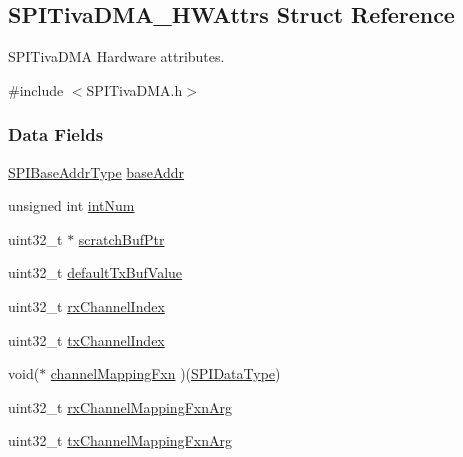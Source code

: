 \subsection{S\-P\-I\-Tiva\-D\-M\-A\-\_\-\-H\-W\-Attrs Struct Reference}
\label{struct_s_p_i_tiva_d_m_a___h_w_attrs}


S\-P\-I\-Tiva\-D\-M\-A Hardware attributes.  




{\ttfamily \#include $<$S\-P\-I\-Tiva\-D\-M\-A.\-h$>$}

\subsubsection*{Data Fields}
\begin{DoxyCompactItemize}
\item 
\hyperlink{_s_p_i_c_c3200_d_m_a_8h_a4b7e9f3739f6196bed13f9c3c549c96d}{S\-P\-I\-Base\-Addr\-Type} \hyperlink{struct_s_p_i_tiva_d_m_a___h_w_attrs_a3264130b8293c92d7556f4288da9e6c3}{base\-Addr}
\item 
unsigned int \hyperlink{struct_s_p_i_tiva_d_m_a___h_w_attrs_aa3c30677a08faf98b923022684288727}{int\-Num}
\item 
uint32\-\_\-t $\ast$ \hyperlink{struct_s_p_i_tiva_d_m_a___h_w_attrs_a91c1a3a97cc28823bdfebd0fdc659a26}{scratch\-Buf\-Ptr}
\item 
uint32\-\_\-t \hyperlink{struct_s_p_i_tiva_d_m_a___h_w_attrs_a9b0752c53408495fb1dfe9358668e023}{default\-Tx\-Buf\-Value}
\item 
uint32\-\_\-t \hyperlink{struct_s_p_i_tiva_d_m_a___h_w_attrs_af18c0efa81dbb2ec14fe1a77b759d7db}{rx\-Channel\-Index}
\item 
uint32\-\_\-t \hyperlink{struct_s_p_i_tiva_d_m_a___h_w_attrs_af2833557c6725d3edf86b4f72543cf1c}{tx\-Channel\-Index}
\item 
void($\ast$ \hyperlink{struct_s_p_i_tiva_d_m_a___h_w_attrs_a87b72b6ad1c1346a49dccc386b406d6e}{channel\-Mapping\-Fxn} )(\hyperlink{_s_p_i_c_c3200_d_m_a_8h_ac69c2f2d8cda29733c058bf8e0233af7}{S\-P\-I\-Data\-Type})
\item 
uint32\-\_\-t \hyperlink{struct_s_p_i_tiva_d_m_a___h_w_attrs_abae80f97226457864feb654117217f66}{rx\-Channel\-Mapping\-Fxn\-Arg}
\item 
uint32\-\_\-t \hyperlink{struct_s_p_i_tiva_d_m_a___h_w_attrs_a58b59e083a9e324970d63c46f3342afe}{tx\-Channel\-Mapping\-Fxn\-Arg}
\end{DoxyCompactItemize}


